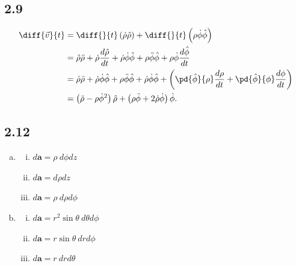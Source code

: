 \documentclass[12pt]{mypackage}
\begin{document}
\subsection{2.9}%
\begin{align*}
  \diff{\vec{v}}{t} &= \diff{}{t}\left(\dot{\rho}\hat\rho\right) + \diff{}{t}\left(\rho\dot\phi\hat\phi\right)\\
                    &= \hat{\rho}\ddot{\rho} + \dot\rho\frac{d\hat\rho}{dt} + \dot\rho\dot\phi\hat{\phi} + \rho\ddot\phi\hat\phi + \rho\dot\phi\frac{d\hat{\phi}}{dt}\\
                    &= \hat\rho\ddot\rho + \dot\rho\dot{\phi}\hat\phi + \rho\ddot\phi\hat\phi + \dot\rho\dot\phi\hat\phi + \left(\pd{\hat\phi}{\rho}\frac{d\rho}{dt} + \pd{\hat\phi}{\phi}\frac{d\phi}{dt}\right)\\
                    &= \left(\ddot\rho - \rho\dot\phi^2\right) \hat{\rho} + \left(\rho\ddot\phi + 2\dot\rho\dot\phi\right)\hat{\phi}.
\end{align*}
\subsection{2.12}%
\begin{enumerate}[(a)]
  \item \hfill
    \begin{enumerate}[(i)]
      \item $d\mathbf{a} = \rho\:d\phi dz$
      \item $d\mathbf{a} = d\rho dz$
      \item $d \mathbf{a} = \rho\:d\rho d\phi$
    \end{enumerate}
  \item \hfill
    \begin{enumerate}[(i)]
      \item $d\mathbf{a} = r^2\sin \theta\:d\theta d\phi$
      \item $d\mathbf{a} = r \sin \theta\:dr d\phi$
      \item $d\mathbf{a} = r\:drd\theta$
    \end{enumerate}
\end{enumerate}
\end{document}
